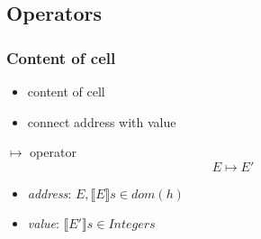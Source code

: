 \documentclass{beamer}
\begin{document}
	\subsection{Operators}


	\begin{frame}[fragile]
	\frametitle{Content of cell}
		\begin{itemize}
			\item content of cell
			\item connect address with value
		\end{itemize}
		\begin{block}{$\mapsto$ operator}
			$$E \mapsto E'$$
			\vspace{-0.7cm}
			\begin{itemize}
				\item \emph{address}: $E, \llbracket E\rrbracket s\in\textit{dom}(h)$
				\item \emph{value}: $\llbracket E'\rrbracket s\in\textit{Integers}$
			\end{itemize}
			\begin{center}
			\end{center}
		\end{block}
	\end{frame}
\end{document}

